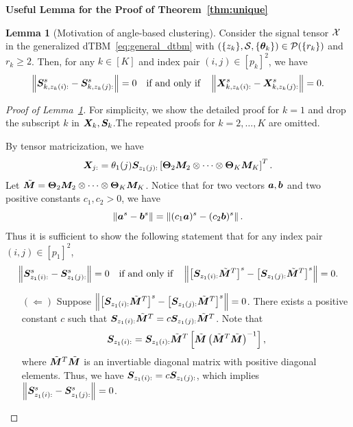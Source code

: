 \documentclass[lettersize,onecolumn,journal]{IEEEtran}
\theoremstyle{definition}
\newtheorem{lem}{Lemma}
\theoremstyle{definition}
\newcommand{\of}[1]{\left(#1\right)}
\newcommand{\off}[1]{\left[#1\right]}
\begin{document}
{\bf Useful Lemma for the Proof of Theorem~\ref{thm:unique}} 

\begin{lem}[Motivation of angle-based clustering]\label{lem:angle} Consider the signal tensor $\mathcal{X}$ in the generalized dTBM~\eqref{eq:general_dtbm} with $(\{z_k\},\mathcal{S},\{\boldsymbol{\theta}_k\})\in \mathcal{P}(\{r_k\})$ and $r_k \geq 2$. Then, for any $k \in [K]$ and index pair $(i,j)\in[p_k]^2$, we have 
\begin{equation}
    \left\lVert \bm S_{k,z_k(i):}^s -  \bm S_{k,z_k(j):}^s \right\rVert = 0 \quad \text{if and only if} \quad \left\lVert  \bm X_{k, z_k(i):}^s -  \bm X_{k,z_k(j):}^s \right\rVert = 0.
\end{equation}
\end{lem}

\begin{proof}[Proof of Lemma~\ref{lem:angle}] For simplicity, we show the detailed proof for $k = 1$ and drop the subscript $k$ in $\bm X_k, \bm S_k$.The repeated proofs for $k = 2, \ldots, K$ are omitted. 

By tensor matricization, we have
\begin{equation}
    \mX_{j:} = \theta_1(j) \mS_{z_1(j):} \off{\mTheta_2 \mM_2 \otimes \cdots \otimes \mTheta_K \mM_K}^T.
\end{equation}     
Let $\tilde {\bm M} = \boldsymbol{\Theta}_2 \bm M_2 \otimes \cdots \otimes \boldsymbol{\Theta}_K \bm M_K$. Notice that for two vectors $\bm{a}, \bm{b}$ and two positive constants $c_1, c_2 >0$, we have
\begin{equation}
\left\lVert\bm{a}^s - \bm{b}^s\right\rVert = \left\lVert(c_1 \bm{a})^s - (c_2\bm{b})^s\right\rVert.
\end{equation}
Thus it is sufficient to show the following statement that for any index pair $(i,j)\in[p_1]^2$,
\begin{equation}
\onorm{ \mS_{z_1(i):}^s - \mS_{z_1(j):}^s} = 0 \quad \text{if and only if} \quad \onorm{ \off{\mS_{z_1(i):} \tilde \mM^T }^s - \off{\mS_{z_1(j):}\tilde \mM^T}^s} = 0.
\end{equation}
\begin{enumerate}
    \item[$(\Leftarrow)$] Suppose $\onorm{ \off{\mS_{z_1(i):} \tilde \mM^T }^s - \off{\mS_{z_1(j):}\tilde \mM^T}^s} = 0$. There exists a positive constant $c$ such that $\bm S_{z_1(i):} \tilde {\bm M}^T= c \bm S_{z_1(j):} \tilde {\bm M}^T$. Note that
\begin{equation}
    \mS_{z_1(i):} = \mS_{z_1(i):} \tilde \mM^T \off{ \tilde \mM \of{ \tilde \mM^T  \tilde \mM}^{-1}},
\end{equation}
where $ \tilde {\bm M}^T  \tilde {\bm M}$ is an invertiable diagonal matrix with positive diagonal elements. Thus, we have $ \bm S_{z_1(i):} = c  \bm S_{z_1(j):}$, which implies $ \left\lVert  \bm S_{z_1(i):}^s -  \bm S_{z_1(j):}^s \right\rVert = 0 $.


\end{enumerate}
\end{proof}
\end{document}
